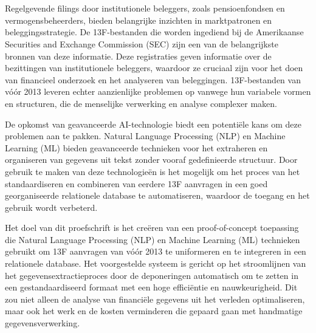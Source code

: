 
\chapter{}%
\label{ch:inleiding}

Regelgevende filings door institutionele beleggers, zoals pensioenfondsen en vermogensbeheerders, bieden belangrijke inzichten in marktpatronen en beleggingsstrategie. De 13F-bestanden die worden ingediend bij de Amerikaanse Securities and Exchange Commission (SEC) zijn een van de belangrijkste bronnen van deze informatie. Deze registraties geven informatie over de bezittingen van institutionele beleggers, waardoor ze cruciaal zijn voor het doen van financieel onderzoek en het analyseren van beleggingen. 13F-bestanden van vóór 2013 leveren echter aanzienlijke problemen op vanwege hun variabele vormen en structuren, die de menselijke verwerking en analyse complexer maken.



De opkomst van geavanceerde AI-technologie biedt een potentiële kans om deze problemen aan te pakken. Natural Language Processing (NLP) en Machine Learning (ML) bieden geavanceerde technieken voor het extraheren en organiseren van gegevens uit tekst zonder vooraf gedefinieerde structuur. Door gebruik te maken van deze technologieën is het mogelijk om het proces van het standaardiseren en combineren van eerdere 13F aanvragen in een goed georganiseerde relationele database te automatiseren, waardoor de toegang en het gebruik wordt verbeterd.



Het doel van dit proefschrift is het creëren van een proof-of-concept toepassing die Natural Language Processing (NLP) en Machine Learning (ML) technieken gebruikt om 13F aanvragen van vóór 2013 te uniformeren en te integreren in een relationele database. Het voorgestelde systeem is gericht op het stroomlijnen van het gegevensextractieproces door de deponeringen automatisch om te zetten in een gestandaardiseerd formaat met een hoge efficiëntie en nauwkeurigheid. Dit zou niet alleen de analyse van financiële gegevens uit het verleden optimaliseren, maar ook het werk en de kosten verminderen die gepaard gaan met handmatige gegevensverwerking.



